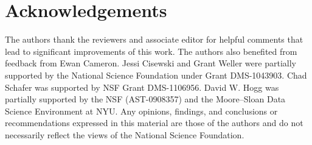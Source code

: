 \documentclass[12pt]{article}
\begin{document}
%
%
%
%

\section*{Acknowledgements}
The authors thank the reviewers and associate editor for helpful comments that lead to significant improvements of this work.  The authors also benefited from feedback from Ewan Cameron.  Jessi Cisewski and Grant Weller were partially supported by the National Science Foundation under Grant DMS-1043903. 
Chad Schafer was supported by NSF Grant DMS-1106956.  David W. Hogg was partially supported by the NSF (AST-0908357) and the Moore--Sloan Data Science Environment at NYU.
Any opinions, findings, and conclusions or recommendations expressed in this material are those of the authors and do not necessarily reflect the views of the National Science Foundation.








\end{document}
